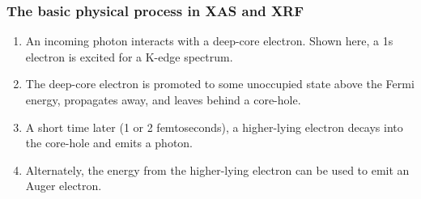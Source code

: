 \documentclass[10pt, xcolor=x11names, compress, handout]{beamer}
\begin{document}
\begin{frame}
  \frametitle{The basic physical process in XAS and XRF}

  \begin{center}
%
%
  \end{center}


  \begin{enumerate}[<+->]
  \item An incoming photon interacts with a deep-core electron.  Shown
    here, a 1s electron is excited for a K-edge spectrum.
  \item The deep-core electron is promoted to some unoccupied state
    above the Fermi energy, propagates away, and leaves behind a
    core-hole.
  \item A short time later (1 or 2 femtoseconds), a higher-lying
    electron decays into the core-hole and emits a photon.
  \item Alternately, the energy from the higher-lying electron can be
    used to emit an Auger electron.
  \end{enumerate}
\end{frame}
\end{document}
